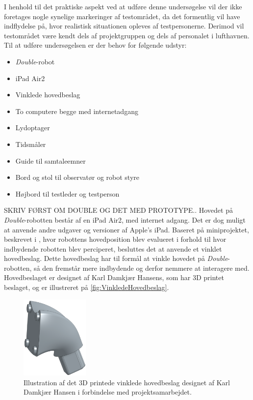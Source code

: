 I henhold til det praktiske aspekt ved at udføre denne undersøgelse vil der ikke foretages nogle synelige markeringer af testområdet, da det formentlig vil have indflydelse på, hvor realistisk situationen opleves af testpersonerne. Derimod vil testområdet være kendt dels af projektgruppen og dels af personalet i lufthavnen. \blankline
%
Til at udføre undersøgelsen er der behov for følgende udstyr:\blankline
%
\begin{itemize}
  \item \textit{Double}-robot
  \item iPad Air2
  \item Vinklede hovedbeslag
  \item To computere begge med internetadgang
  \item Lydoptager
  \item Tidsmåler
  \item Guide til samtaleemner
  \item Bord og stol til observatør og robot styre
  \item Højbord til testleder og testperson\blankline
\end{itemize}
\noindent
%
SKRIV FØRST OM DOUBLE OG DET MED PROTOTYPE.. \blankline
%
Hovedet på \textit{Double}-robotten består af en iPad Air2, med internet adgang. Det er dog muligt at anvende andre udgaver og versioner af Apple's iPad. Baseret på miniprojektet, beskrevet i \fullref{\MiniprojektHovedeVinkelpartname}, hvor robottens hovedposition blev evalueret i forhold til hvor indbydende robotten blev perciperet, besluttes det at anvende et vinklet hovedbeslag. Dette hovedbeslag har til formål at vinkle hovedet på \textit{Double}-robotten, så den fremstår mere indbydende og derfor nemmere at interagere med. Hovedbeslaget er designet af Karl Damkjær Hansens, som har 3D printet beslaget, og er illustreret på \autoref{fig:VinkledeHovedbeslag}.            
%
\begin{figure}[H]
\centering
\includegraphics[width = 0.3\textwidth]{Figure/VinkledeHovedbeslag} 
\caption{Illustration af det 3D printede vinklede hovedbeslag designet af Karl Damkjær Hansen i forbindelse med projektsamarbejdet.}
\label{fig:VinkledeHovedbeslag}
\end{figure}
